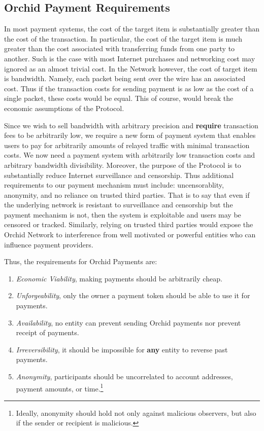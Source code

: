 \subsection{Orchid Payment Requirements}
\label{sec:paymentreqs}

In most payment systems, the cost of the target item is substantially greater than the cost of the transaction. In particular, the cost of the target item is much greater than the cost associated with transferring funds from one party to another. Such is the case with most Internet purchases and networking cost may ignored as an almost trivial cost. In the \Orchid{} Network however, the cost of target item is bandwidth. Namely, each packet being sent over the wire has an associated cost. Thus if the transaction costs for sending payment is as low as the cost of a single packet, these costs would be equal. This of course, would break the economic assumptions of the \Orchid{} Protocol. 

Since we wish to sell bandwidth with arbitrary precision and \textbf{require} transaction fees to be arbitrarily low, we require a new form of payment system that enables users to pay for arbitrarily amounts of relayed traffic with minimal transaction costs. We now need a payment system with arbitrarily low transaction costs and arbitrary bandwidth divisibility. Moreover, the purpose of the \Orchid{} Protocol is to substantially reduce Internet surveillance and censorship. Thus additional requirements to our payment mechanism must include: uncensorablity, anonymity, and no reliance on trusted third parties. That is to say that even if the underlying network is resistant to surveillance and censorship but the payment mechanism is not, then the system is exploitable  and users may be censored or tracked. Similarly, relying on trusted third parties would expose the Orchid Network to interference from well motivated or powerful entities who can influence payment providers.

Thus, the requirements for Orchid Payments are:
\begin{enumerate}
\item \textit{Economic Viability}, making payments should be arbitrarily cheap.
\item \textit{Unforgeability}, only the owner a payment token should be able to use it for payments.
\item \textit{Availability}, no entity can prevent sending Orchid payments nor prevent receipt of payments.
\item \textit{Irreversibility}, it should be impossible for \textbf{any} entity to reverse past payments.
\item \textit{Anonymity}, participants should be uncorrelated to account addresses, payment amounts, or time.\footnote{Ideally, anonymity should hold not only against malicious observers, but also if the sender or recipient is malicious.}
\end{enumerate}

